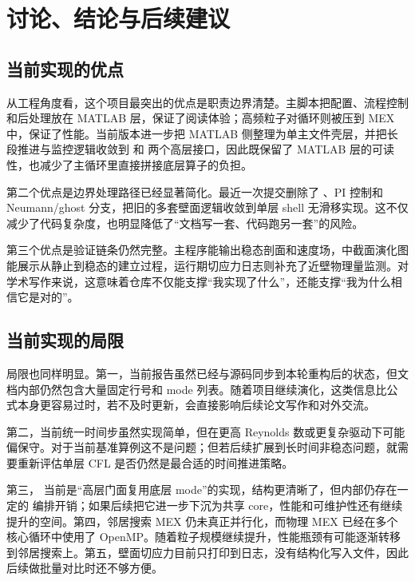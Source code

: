 \chapter{讨论、结论与后续建议}
\label{chap:discussion}

\section{当前实现的优点}
从工程角度看，这个项目最突出的优点是职责边界清楚。主脚本把配置、流程控制和后处理放在 MATLAB 层，保证了阅读体验；高频粒子对循环则被压到 MEX 中，保证了性能。当前版本进一步把 MATLAB 侧整理为单主文件壳层，并把长段推进与监控逻辑收敛到  和  两个高层接口，因此既保留了 MATLAB 层的可读性，也减少了主循环里直接拼接底层算子的负担。

第二个优点是边界处理路径已经显著简化。最近一次提交删除了 、PI 控制和 Neumann/ghost 分支，把旧的多套壁面逻辑收敛到单层 shell 无滑移实现。这不仅减少了代码复杂度，也明显降低了“文档写一套、代码跑另一套”的风险。

第三个优点是验证链条仍然完整。主程序能输出稳态剖面和速度场，中截面演化图能展示从静止到稳态的建立过程，运行期切应力日志则补充了近壁物理量监测。对学术写作来说，这意味着仓库不仅能支撑“我实现了什么”，还能支撑“我为什么相信它是对的”。

\section{当前实现的局限}
局限也同样明显。第一，当前报告虽然已经与源码同步到本轮重构后的状态，但文档内部仍然包含大量固定行号和 mode 列表。随着项目继续演化，这类信息比公式本身更容易过时，若不及时更新，会直接影响后续论文写作和对外交流。

第二，当前统一时间步虽然实现简单，但在更高 Reynolds 数或更复杂驱动下可能偏保守。对于当前基准算例这不是问题；但若后续扩展到长时间非稳态问题，就需要重新评估单层 CFL 是否仍然是最合适的时间推进策略。

第三， 当前是“高层门面复用底层 mode”的实现，结构更清晰了，但内部仍存在一定的  编排开销；如果后续把它进一步下沉为共享 core，性能和可维护性还有继续提升的空间。第四，邻居搜索 MEX 仍未真正并行化，而物理 MEX 已经在多个核心循环中使用了 OpenMP。随着粒子规模继续提升，性能瓶颈有可能逐渐转移到邻居搜索上。第五，壁面切应力目前只打印到日志，没有结构化写入文件，因此后续做批量对比时还不够方便。

